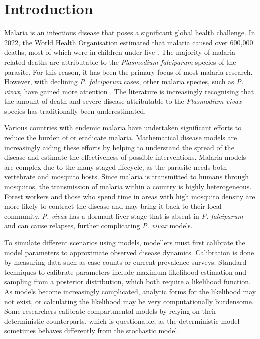 \chapter{Introduction}

Malaria is an infectious disease that poses a significant global health 
challenge. In 2022, the World Health Organisation estimated that malaria 
caused over 600,000 
deaths, most of which were in children under five 
\parencite{world_health_organization_world_2022}. 
The majority of malaria-related deaths are attributable to the 
\textit{Plasmodium falciparum} species of the parasite. 
For this reason, it has been the primary focus of most malaria research. 
However,
with declining \textit{P. falciparum} cases, other malaria species, such as
\textit{P. vivax}, have gained more attention \parencite{price_plasmodium_2020}.
The literature is increasingly recognising that 
the amount of death and severe disease attributable to the 
\textit{Plasmodium vivax} species has 
traditionally been underestimated. 

Various countries with endemic malaria have undertaken significant efforts to 
reduce the burden of or eradicate malaria. Mathematical disease models are 
increasingly aiding these efforts by helping to understand the spread of the 
disease and estimate the effectiveness of possible interventions. 
Malaria models are complex due to the many staged lifecycle, as the parasite 
needs both vertebrate and mosquito hosts. Since malaria is transmitted to humans
through mosquitos, the transmission of malaria within a country is highly 
heterogeneous. Forest workers and those who spend time in areas with high
mosquito density are more likely to contract the disease and may bring
it back to their local community. \textit{P. vivax} has a dormant liver 
stage that is absent in \textit{P. falciparum} and can cause relapses, 
further complicating \textit{P. vivax} models.

To simulate different scenarios using models, modellers must first calibrate
the model parameters to approximate observed disease dynamics. Calibration
is done by 
measuring data such as case counts or current prevalence surveys. 
Standard techniques
to calibrate parameters include maximum likelihood estimation and sampling
from a posterior distribution, which both require a likelihood function. As
models become increasingly complicated, analytic forms for the likelihood may
not exist, or calculating the likelihood may be very computationally
burdensome. Some researchers calibrate compartmental models by relying on
their deterministic counterparts, which is questionable, as the deterministic
model sometimes behaves differently from the stochastic model.

